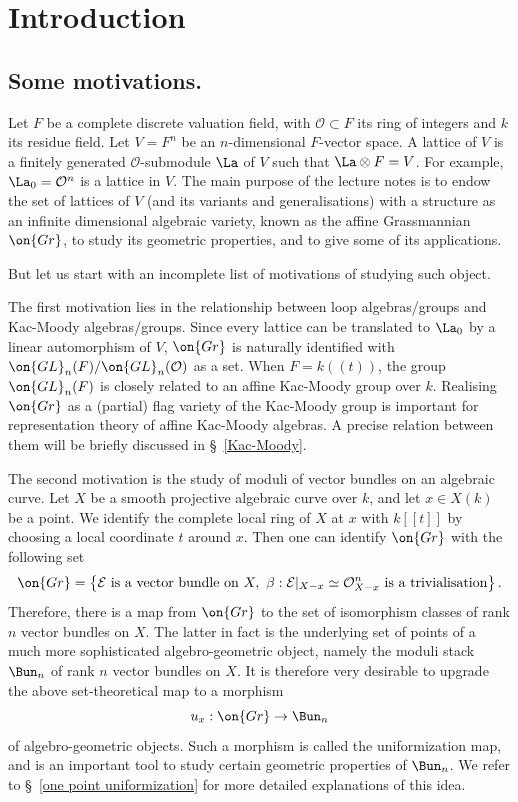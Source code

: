 \documentclass[]{pcmi}
\theoremstyle{plain}
\theoremstyle{remark}
\theoremstyle{definition}
\newcommand{\mE}{{\mathcal E}}
\newcommand{\mO}{{\mathcal O}}
\newcommand{\Gr}{{\on{Gr}}}
\newcommand{\GL}{{\on{GL}}}
\begin{document}



\tableofcontents


\section*{Introduction}
\subsection{Some motivations.}
Let $F$ be a complete discrete valuation field, with $\mO\subset F$ its ring of integers and $k$ its residue field. Let $V=F^n$ be an $n$-dimensional $F$-vector space. A lattice of $V$ is a finitely generated $\mO$-submodule $\La$ of $V$ such that $\La\otimes F=V$. For example, $\La_0=\mO^n$ is a lattice in $V$. The main purpose of the lecture notes is to endow the set of lattices of $V$ (and its variants and generalisations) with a structure as an infinite dimensional algebraic variety, known as the affine Grassmannian $\Gr$, to study its geometric properties, and to give some of its applications.

But let us start with an incomplete list of motivations of studying such object.



The first motivation lies in the relationship between loop algebras/groups and Kac-Moody algebras/groups. Since every lattice can be translated to $\La_0$ by a linear automorphism of $V$, $\Gr$ is naturally identified with $\GL_n(F)/\GL_n(\mO)$ as a set. When $F=k((t))$, the group $\GL_n(F)$ is closely related to an affine Kac-Moody group over $k$. Realising $\Gr$ as a (partial) flag variety of the Kac-Moody group is important for representation theory of affine Kac-Moody algebras. A precise relation between them will be briefly discussed in \S\ \ref{Kac-Moody}.




The second motivation is the study of moduli of vector bundles on an algebraic curve. Let $X$ be a smooth projective algebraic curve over $k$, and let $x\in X(k)$ be a point. We identify the complete local ring of $X$ at $x$ with $k[[t]]$ by choosing a local coordinate $t$ around $x$. Then one can identify $\Gr$ with the following set
\[\Gr=\left\{ \mE \mbox{ is a vector bundle on } X, \ \beta: \mE|_{X-x}\simeq \mO_{X-x}^n \mbox{ is a trivialisation}\right\}.\]
Therefore, there is a map from $\Gr$ to the set of isomorphism classes of rank $n$ vector bundles on $X$. The latter in fact is the underlying set of points of a much more sophisticated algebro-geometric object, namely the moduli stack $\Bun_n$ of rank $n$ vector bundles on $X$. It is therefore very desirable to upgrade the above set-theoretical map to a morphism
\[u_x:\Gr\to \Bun_n\]
of algebro-geometric objects.
Such a morphism is called the uniformization map, and is an important tool to study certain geometric properties of $\Bun_n$. We refer to \S\ \ref{one point uniformization} for more detailed explanations of this idea.
\end{document}
